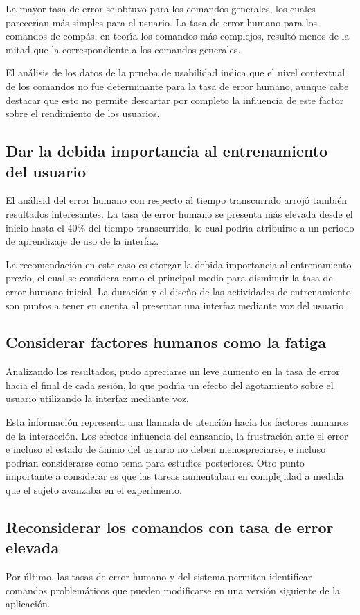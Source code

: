 La mayor tasa de error se obtuvo para los comandos generales, los cuales parecer{\'\i}an m\'as simples 
para el usuario. La tasa de error humano para los comandos de comp\'as, 
en teor{\'\i}a los comandos m\'as complejos,
result\'o menos de la mitad que la correspondiente a los comandos generales.

El an\'alisis de los datos de la prueba de usabilidad indica que el nivel contextual de los comandos no
fue determinante para la tasa de error humano, aunque cabe destacar que esto no permite descartar
por completo la influencia de este factor sobre el rendimiento de los usuarios.


\subsection{Dar la debida importancia al entrenamiento del usuario}
El an\'alisid del error humano con respecto al tiempo transcurrido arroj\'o tambi\'en
resultados interesantes. La tasa de error humano se presenta m\'as elevada desde el inicio hasta
el 40\% del tiempo transcurrido, lo cual podr{{\'\i}}a atribuirse a un periodo de aprendizaje
de uso de la interfaz.

La recomendaci\'on en este caso es otorgar la debida importancia al entrenamiento previo,
el cual se considera como el principal medio para disminuir la tasa de error humano inicial.
La duraci\'on y el dise\~no de las actividades de entrenamiento son puntos a tener en cuenta
al presentar una interfaz mediante voz del usuario.

\subsection{Considerar factores humanos como la fatiga}
Analizando los resultados, pudo apreciarse un leve aumento en la tasa de error hacia el final de
cada sesi\'on, lo que podr{{\'\i}}a un efecto del agotamiento sobre el usuario utilizando la
interfaz mediante voz.

Esta informaci\'on representa una llamada de atenci\'on hacia los factores humanos de la interacci\'on.
Los efectos influencia del cansancio, la frustraci\'on ante el error e incluso el estado de \'animo
del usuario no deben menospreciarse, e incluso podr{\'\i}an considerarse como tema para estudios
posteriores. Otro punto importante a considerar es que las tareas aumentaban en complejidad a medida que
el sujeto avanzaba en el experimento.

\subsection{Reconsiderar los comandos con tasa de error elevada}
Por \'ultimo, las tasas de error humano y del sistema permiten identificar comandos 
problem\'aticos que pueden modificarse en una versi\'on siguiente de la aplicaci\'on.


